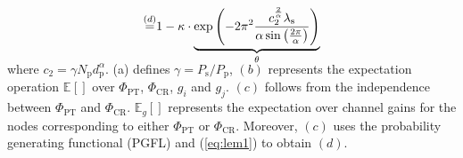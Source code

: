 \documentclass[conference, twocolumn]{IEEEtran}
\newcommand{\e}[2]{{\mathbb E}_{#1}\left[ #2 \right]}
\newcommand{\sub}[1]{_{\text{#1}}}
\DeclareMathOperator*{\gthan}{\ge}
\DeclareMathOperator*{\eqto}{=}
\begin{document}
\begin{IEEEproof}
\begin{align}
\quad \eqto^{(d)}& 1 - \kappa \cdot \smash[b]{\underbrace{\exp \left( - 2\pi^2 \frac{c_2^{\frac{2}{\alpha}} \lambda\sub{s}}{\alpha \sin \left( \frac{2\pi}{\alpha} \right)} \right)}_{\theta}} \label{eq:SIROutPR}   
\end{align}
\\[0.5em]
where $c_2 = \gamma N\sub{p} d\sub{p}^{\alpha}$. (a) defines $\gamma = P\sub{s}/P\sub{p}$, $(b)$ represents the expectation operation $\e{\mathsf{}}{}$ over $\Phi_{\text{PT}}$, $\Phi_{\text{CR}}$, $g_i$ and $g_j$. $(c)$ follows from the independence between $\Phi_{\text{PT}}$ and $\Phi_{\text{CR}}$. $\e{g}{}$ represents the expectation over channel gains for the nodes corresponding to either $\Phi\sub{PT}$ or $\Phi\sub{CR}$. Moreover, $(c)$ uses the probability generating functional (PGFL) \cite[Appendix, A.5]{Haenggi08now} and (\ref{eq:lem1}) to obtain $(d)$. 
\end{IEEEproof}
\end{document}
